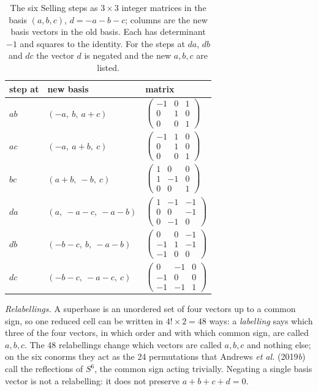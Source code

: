 \begin{table}
\caption{The six Selling steps as $3\times3$ integer matrices in the basis $(a,b,c)$, $d=-a-b-c$; columns are the new basis vectors in the old basis. Each has determinant $-1$ and squares to the identity. For the steps at $da$, $db$ and $dc$ the vector $d$ is negated and the new $a,b,c$ are listed.}
\label{tab:flips}
\begin{tabular}{lll}
\toprule
step at & new basis & matrix \\
\midrule
$ab$ & $(-a,\ b,\ a+c)$ & $\begin{pmatrix}-1&0&1\\0&1&0\\0&0&1\end{pmatrix}$ \\[1.5ex]
$ac$ & $(-a,\ a+b,\ c)$ & $\begin{pmatrix}-1&1&0\\0&1&0\\0&0&1\end{pmatrix}$ \\[1.5ex]
$bc$ & $(a+b,\ -b,\ c)$ & $\begin{pmatrix}1&0&0\\1&-1&0\\0&0&1\end{pmatrix}$ \\[1.5ex]
$da$ & $(a,\ -a-c,\ -a-b)$ & $\begin{pmatrix}1&-1&-1\\0&0&-1\\0&-1&0\end{pmatrix}$ \\[1.5ex]
$db$ & $(-b-c,\ b,\ -a-b)$ & $\begin{pmatrix}0&0&-1\\-1&1&-1\\-1&0&0\end{pmatrix}$ \\[1.5ex]
$dc$ & $(-b-c,\ -a-c,\ c)$ & $\begin{pmatrix}0&-1&0\\-1&0&0\\-1&-1&1\end{pmatrix}$ \\
\bottomrule
\end{tabular}
\end{table}

\emph{Relabellings.} A superbase is an unordered set of four vectors up to a common sign, so one reduced cell can be written in $4!\times2=48$ ways: a \emph{labelling} says which three of the four vectors, in which order and with which common sign, are called $a,b,c$. The 48 relabellings change which vectors are called $a,b,c$ and nothing else; on the six conorms they act as the 24 permutations that Andrews \emph{et al.} (2019\emph{b}) call the reflections of $S^6$, the common sign acting trivially. Negating a single basis vector is not a relabelling: it does not preserve $a+b+c+d=0$.

